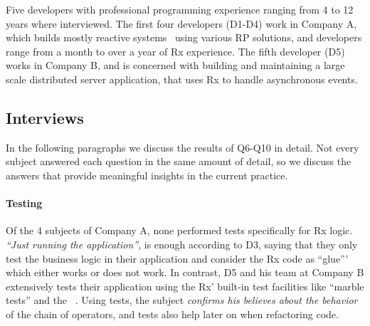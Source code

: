 Five developers with professional programming experience ranging from 4
to 12 years where interviewed.  The first four developers (D1-D4) work
in Company A, which builds mostly reactive systems~\cite{boner2014reactive}
using various RP solutions, and developers range from a month to over a
year of Rx experience.  The fifth developer (D5) works in Company B, and
is concerned with building and maintaining a large scale distributed
server application, that uses Rx to handle asynchronous events.

\subsection{Interviews} In the following paragraphs we discuss the
results of Q6-Q10 in detail.  Not every subject answered each question
in the same amount of detail, so we discuss the answers that provide
meaningful insights in the current practice.

\paragraph{Testing} Of the 4 subjects of Company A, none performed tests
specifically for Rx logic.  \emph{``Just running the application''}, is
enough according to D3, saying that they only test the business logic in
their application and consider the Rx code as ``glue''' which either
works or does not work.  In contrast, D5 and his team at Company B
extensively tests their application using the Rx' built-in test
facilities like ``marble tests'' and the ~\cite{reactivex}.
Using tests, the subject \emph{confirms his believes about the behavior}
of the chain of operators, and tests also help later on when refactoring
code.

